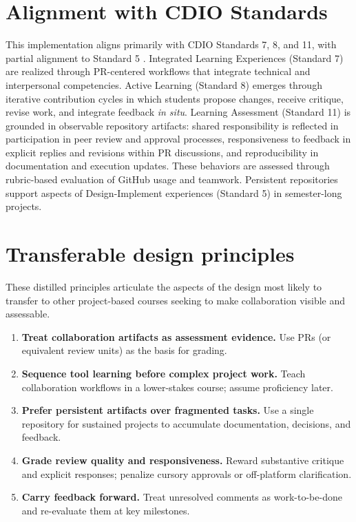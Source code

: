 \begin{table}[t]
\centering
\footnotesize
\renewcommand{\arraystretch}{1.1}
\caption{Rubric used to assess GitHub collaboration practices in the IE course}\label{tbl:IE-rubric}

\end{table}

\section{Alignment with CDIO Standards}
This implementation aligns primarily with CDIO Standards 7, 8, and 11, with partial alignment to Standard 5 \parencite{malmqvist2020standards3}. 
Integrated Learning Experiences (Standard 7) are realized through PR-centered workflows that integrate technical and interpersonal competencies. Active Learning (Standard 8) emerges through iterative contribution cycles in which students propose changes, receive critique, revise work, and integrate feedback \emph{in situ}. 
Learning Assessment (Standard 11) is grounded in observable repository artifacts: shared responsibility is reflected in participation in peer review and approval processes, responsiveness to feedback in explicit replies and revisions within PR discussions, and reproducibility in documentation and execution updates. These behaviors are assessed through rubric-based evaluation of GitHub usage and teamwork.
Persistent repositories support aspects of Design-Implement experiences (Standard 5) in semester-long projects.



\section{Transferable design principles}
These distilled principles articulate the aspects of the design most likely to transfer to other project-based courses seeking to make collaboration visible and assessable.

\begin{enumerate}
    \item \textbf{Treat collaboration artifacts as assessment evidence.} Use PRs (or equivalent review units) as the basis for grading.
    \item \textbf{Sequence tool learning before complex project work.} Teach collaboration workflows in a lower-stakes course; assume proficiency later.
    \item \textbf{Prefer persistent artifacts over fragmented tasks.} Use a single repository for sustained projects to accumulate documentation, decisions, and feedback.
    \item \textbf{Grade review quality and responsiveness.} Reward substantive critique and explicit responses; penalize cursory approvals or off-platform clarification.
    \item \textbf{Carry feedback forward.} Treat unresolved comments as work-to-be-done and re-evaluate them at key milestones.
\end{enumerate}


